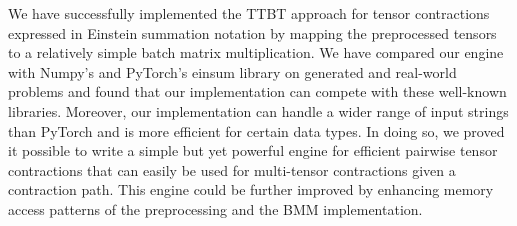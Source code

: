 We have successfully implemented the TTBT approach for tensor contractions expressed in Einstein summation notation by mapping the preprocessed tensors to a relatively simple batch matrix multiplication. We have compared our engine with Numpy's \cite{Numpy} and PyTorch's \cite{PyTorch} einsum library on generated and real-world problems and found that our implementation can compete with these well-known libraries. Moreover, our implementation can handle a wider range of input strings than PyTorch and is more efficient for certain data types. In doing so, we proved it possible to write a simple but yet powerful engine for efficient pairwise tensor contractions that can easily be used for multi-tensor contractions given a contraction path. This engine could be further improved by enhancing memory access patterns of the preprocessing and the BMM implementation.
